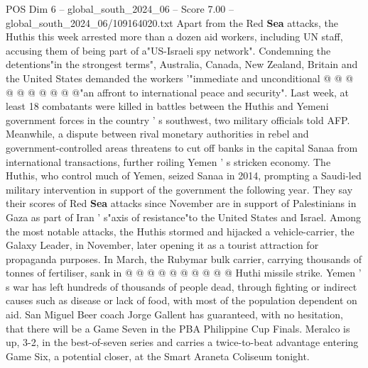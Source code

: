 \begin{textsample}{POS Dim 6 – global\_south\_2024\_06 – Score 7.00 – global\_south\_2024\_06/109164020.txt}
Apart from the Red \textbf{Sea} attacks, the Huthis this week arrested more than a dozen aid workers, including UN staff, accusing them of being part of a"US-Israeli spy network".
Condemning the detentions"in the strongest terms", Australia, Canada, New Zealand, Britain and the United States demanded the workers '"immediate and unconditional @ @ @ @ @ @ @ @ @ @"an affront to international peace and security".
Last week, at least 18 combatants were killed in battles between the Huthis and Yemeni government forces in the country ' s southwest, two military officials told AFP.
Meanwhile, a dispute between rival monetary authorities in rebel and government-controlled areas threatens to cut off banks in the capital Sanaa from international transactions, further roiling Yemen ' s stricken economy.
The Huthis, who control much of Yemen, seized Sanaa in 2014, prompting a Saudi-led military intervention in support of the government the following year.
They say their scores of Red \textbf{Sea} attacks since November are in support of Palestinians in Gaza as part of Iran ' s"axis of resistance"to the United States and Israel.
Among the most notable attacks, the Huthis stormed and hijacked a vehicle-carrier, the Galaxy Leader, in November, later opening it as a tourist attraction for propaganda purposes.
In March, the Rubymar bulk carrier, carrying thousands of tonnes of fertiliser, sank in @ @ @ @ @ @ @ @ @ @ Huthi missile strike.
Yemen ' s war has left hundreds of thousands of people dead, through fighting or indirect causes such as disease or lack of food, with most of the population dependent on aid.
San Miguel Beer coach Jorge Gallent has guaranteed, with no hesitation, that there will be a Game Seven in the PBA Philippine Cup Finals.
Meralco is up, 3-2, in the best-of-seven series and carries a twice-to-beat advantage entering Game Six, a potential closer, at the Smart Araneta Coliseum tonight.

\end{textsample}
